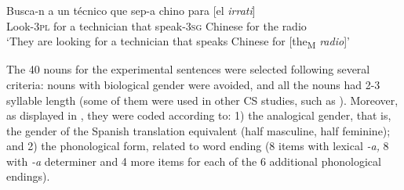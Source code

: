 \documentclass[output=paper]{langscibook}
\begin{document}
\ea%
    \label{ex:ezeiza:13}
\gll          Busca-n   a  un técnico        que  sep-a       chino     para [el \textit{irrati}]\\
        Look-3\textsc{pl} for a  technician   that  speak-3\textsc{sg}  Chinese for   the radio\\
\glt        ‘They are looking for a technician that speaks Chinese for [the\textsubscript{M} \textit{radio}]’
    \z

The 40 nouns for the experimental sentences were selected following several criteria: nouns with biological gender were avoided, and all the nouns had 2-3 syllable length (some of them were used in other CS studies, such as \citealt{Munarriz-IbarrolaEtAl2022,ParafitaCoutoEtAl2015basque}). Moreover, as displayed in , they were coded according to: 1) the analogical gender, that is, the gender of the Spanish translation equivalent (half masculine, half feminine); and 2) the phonological form, related to word ending (8 items with lexical \textit{-a,} 8 with \textit{-a} determiner and 4 more items for each of the 6 additional phonological endings).
\end{document}
